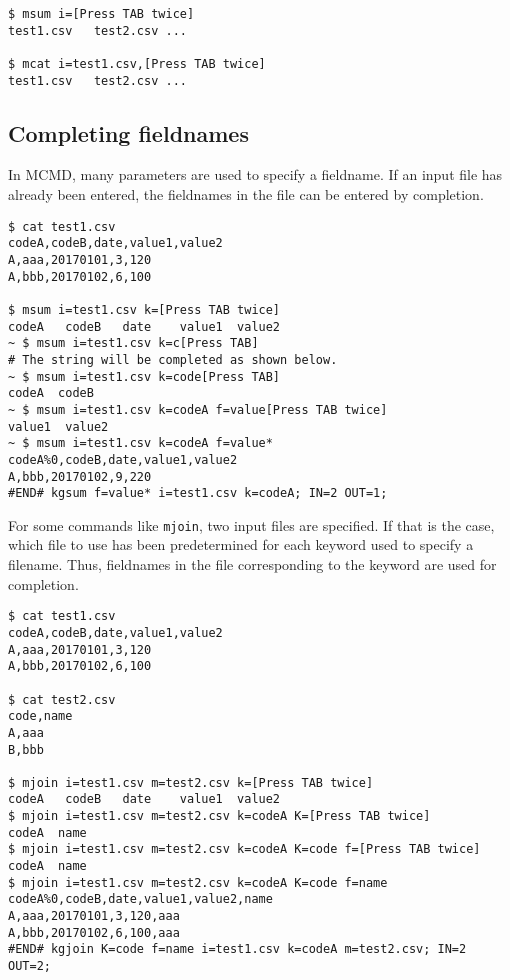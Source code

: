 \begin{Verbatim}[baselinestretch=0.7,frame=single]
$ msum i=[Press TAB twice]
test1.csv   test2.csv ...

$ mcat i=test1.csv,[Press TAB twice]
test1.csv   test2.csv ...
\end{Verbatim}

\subsection{Completing fieldnames\label{sect:bash_comp_field}}
In MCMD, many parameters are used to specify a fieldname. If an input file has already been entered, the fieldnames in the file can be entered by completion.

\begin{Verbatim}[baselinestretch=0.7,frame=single]
$ cat test1.csv 
codeA,codeB,date,value1,value2
A,aaa,20170101,3,120
A,bbb,20170102,6,100

$ msum i=test1.csv k=[Press TAB twice]
codeA   codeB   date    value1  value2  
~ $ msum i=test1.csv k=c[Press TAB]
# The string will be completed as shown below.
~ $ msum i=test1.csv k=code[Press TAB]
codeA  codeB
~ $ msum i=test1.csv k=codeA f=value[Press TAB twice]
value1  value2
~ $ msum i=test1.csv k=codeA f=value*
codeA%0,codeB,date,value1,value2
A,bbb,20170102,9,220
#END# kgsum f=value* i=test1.csv k=codeA; IN=2 OUT=1;
\end{Verbatim}

For some commands like \verb|mjoin|, two input files are specified. If that is the case, which file to use has been predetermined for each keyword used to specify a filename. Thus, fieldnames in the file corresponding to the keyword are used for completion.

\begin{Verbatim}[baselinestretch=0.7,frame=single]
$ cat test1.csv 
codeA,codeB,date,value1,value2
A,aaa,20170101,3,120
A,bbb,20170102,6,100

$ cat test2.csv
code,name
A,aaa
B,bbb

$ mjoin i=test1.csv m=test2.csv k=[Press TAB twice]
codeA   codeB   date    value1  value2
$ mjoin i=test1.csv m=test2.csv k=codeA K=[Press TAB twice]
codeA  name
$ mjoin i=test1.csv m=test2.csv k=codeA K=code f=[Press TAB twice]
codeA  name
$ mjoin i=test1.csv m=test2.csv k=codeA K=code f=name
codeA%0,codeB,date,value1,value2,name
A,aaa,20170101,3,120,aaa
A,bbb,20170102,6,100,aaa
#END# kgjoin K=code f=name i=test1.csv k=codeA m=test2.csv; IN=2 OUT=2;
\end{Verbatim}


